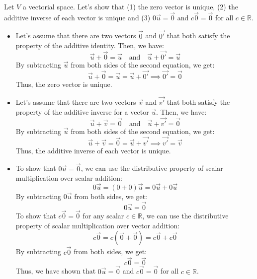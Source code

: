 \begin{eg}
    Let $V$ a vectorial space. Let's show that (1) the zero vector is unique, (2) the additive inverse of each vector is unique and (3) $0 \vec{u} = \vec{0}$ and $c \vec{0} = \vec{0}$ for all $c \in \mathbb{R}$.
    \begin{itemize}[itemsep=1pt,label=$\circ$]
        \item Let's assume that there are two vectors $\vec{0}$ and $\vec{0'}$ that both satisfy the property of the additive identity. Then, we have:
        \[\vec{u} + \vec{0} = \vec{u} \quad \text{and} \quad \vec{u} + \vec{0'} = \vec{u}\]
        By subtracting $\vec{u}$ from both sides of the second equation, we get:
        \[ \vec{u} + \vec{0} = \vec{u} = \vec{u} + \vec{0'} \implies \vec{0'} = \vec{0}\]
        Thus, the zero vector is unique.
        \item Let's assume that there are two vectors $\vec{v}$ and $\vec{v'}$ that both satisfy the property of the additive inverse for a vector $\vec{u}$. Then, we have:
        \[\vec{u} + \vec{v} = \vec{0} \quad \text{and} \quad \vec{u} + \vec{v'} = \vec{0}\]
        By subtracting $\vec{u}$ from both sides of the second equation, we get:
        \[ \vec{u} + \vec{v} = \vec{0} = \vec{u} + \vec{v'} \implies \vec{v'} = \vec{v}\]
        Thus, the additive inverse of each vector is unique.
        \item To show that $0 \vec{u} = \vec{0}$, we can use the distributive property of scalar multiplication over scalar addition:
        \[0 \vec{u} = (0 + 0) \vec{u} = 0 \vec{u} + 0 \vec{u}\]
        By subtracting $0 \vec{u}$ from both sides, we get:
        \[0 \vec{u} = \vec{0}\]
        To show that $c \vec{0} = \vec{0}$ for any scalar $c \in \mathbb{R}$, we can use the distributive property of scalar multiplication over vector addition:
        \[c \vec{0} = c (\vec{0} + \vec{0}) = c \vec{0} + c \vec{0}\]
        By subtracting $c \vec{0}$ from both sides, we get:
        \[c \vec{0} = \vec{0}\]
        Thus, we have shown that $0 \vec{u} = \vec{0}$ and $c \vec{0} = \vec{0}$ for all $c \in \mathbb{R}$.
    \end{itemize}
\end{eg}

